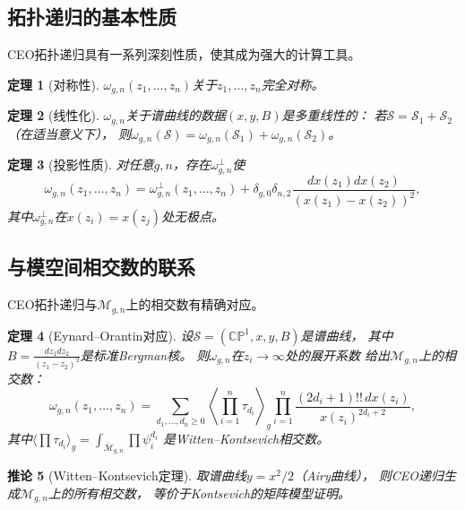 \documentclass[11pt,a4paper]{article}
\theoremstyle{plain}
\newtheorem{theorem}{定理}[section]
\newtheorem{corollary}[theorem]{推论}
\theoremstyle{definition}
\newcommand{\CP}{\mathbb{CP}}
\newcommand{\Mbar}{\overline{\mathcal{M}}}
\newcommand{\Mcal}{\mathcal{M}}
\begin{document}
\subsection{拓扑递归的基本性质}

CEO拓扑递归具有一系列深刻性质，使其成为强大的计算工具。

\begin{theorem}[对称性]\label{thm:sym}
$\omega_{g,n}(z_1, \ldots, z_n)$关于$z_1, \ldots, z_n$完全对称。
\end{theorem}

\begin{theorem}[线性化]\label{thm:lin}
$\omega_{g,n}$关于谱曲线的数据$(x, y, B)$是多重线性的：
若$\mathcal{S} = \mathcal{S}_1 + \mathcal{S}_2$（在适当意义下），
则$\omega_{g,n}(\mathcal{S}) = \omega_{g,n}(\mathcal{S}_1) + \omega_{g,n}(\mathcal{S}_2)$。
\end{theorem}

\begin{theorem}[投影性质]\label{thm:proj}
对任意$g, n$，存在$\omega_{g,n}^\perp$使
\[
\omega_{g,n}(z_1, \ldots, z_n) = \omega_{g,n}^\perp(z_1, \ldots, z_n)
+ \delta_{g,0}\delta_{n,2} \frac{dx(z_1) dx(z_2)}{(x(z_1) - x(z_2))^2},
\]
其中$\omega_{g,n}^\perp$在$x(z_i) = x(z_j)$处无极点。
\end{theorem}

\subsection{与模空间相交数的联系}

CEO拓扑递归与$\Mcal_{g,n}$上的相交数有精确对应。

\begin{theorem}[Eynard--Orantin对应]\label{thm:EOcorrespond}
设$\mathcal{S} = (\CP^1, x, y, B)$是谱曲线，
其中$B = \frac{dz_1 dz_2}{(z_1-z_2)^2}$是标准Bergman核。
则$\omega_{g,n}$在$z_i \to \infty$处的展开系数
给出$\Mcal_{g,n}$上的相交数：
\[
\omega_{g,n}(z_1, \ldots, z_n)
= \sum_{d_1, \ldots, d_n \geq 0}
\left\langle \prod_{i=1}^n \tau_{d_i} \right\rangle_g
\prod_{i=1}^n \frac{(2d_i+1)!! \, dx(z_i)}{x(z_i)^{2d_i+2}},
\]
其中$\langle \prod \tau_{d_i} \rangle_g = \int_{\Mbar_{g,n}} \prod \psi_i^{d_i}$
是Witten--Kontsevich相交数。
\end{theorem}

\begin{corollary}[Witten--Kontsevich定理]\label{cor:WK}
取谱曲线$y = x^2/2$（Airy曲线），
则CEO递归生成$\Mcal_{g,n}$上的所有相交数，
等价于Kontsevich的矩阵模型证明。
\end{corollary}
\end{document}
